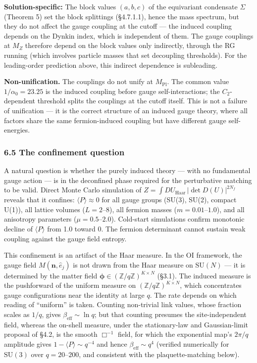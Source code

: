 \documentclass[
]{article}
\begin{document}
\textbf{Solution-specific:} The block values \((a, b, c)\) of the
equivariant condensate \(\Sigma\) (Theorem 5) set the block splittings
(§4.7.1.1), hence the mass spectrum, but they do not affect the gauge
coupling at the cutoff --- the induced coupling depends on the Dynkin
index, which is independent of them. The gauge couplings at \(M_Z\)
therefore depend on the block values only indirectly, through the RG
running (which involves particle masses that set decoupling thresholds).
For the leading-order prediction above, this indirect dependence is
subleading.

\textbf{Non-unification.} The couplings do not unify at
\(M_{\text{Pl}}\). The common value \(1/\alpha_0 = 23.25\) is the
induced coupling before gauge self-interactions; the \(C_2\)-dependent
threshold splits the couplings at the cutoff itself. This is not a
failure of unification --- it is the correct structure of an induced
gauge theory, where all factors share the same fermion-induced coupling
but have different gauge self-energies.

\hypertarget{the-confinement-question}{%
\subsubsection{6.5 The confinement
question}\label{the-confinement-question}}

A natural question is whether the purely induced theory --- with no
fundamental gauge action --- is in the deconfined phase required for the
perturbative matching to be valid. Direct Monte Carlo simulation of
\(Z = \int DU_{\text{Haar}} \, |\det D(U)|^{2N_f}\) reveals that it
confines: \(\langle P \rangle \approx 0\) for all gauge groups (SU(3),
SU(2), compact U(1)), all lattice volumes (\(L = 2\)--\(8\)), all
fermion masses (\(m = 0.01\)--\(1.0\)), and all anisotropy parameters
(\(\mu = 0.5\)--\(2.0\)). Cold-start simulations confirm monotonic
decline of \(\langle P \rangle\) from 1.0 toward 0. The fermion
determinant cannot sustain weak coupling against the gauge field
entropy.

This confinement is an artifact of the Haar measure. In the OI
framework, the gauge field \(M(\mathbf{n}, \hat{e}_j)\) is not drawn
from the Haar measure on \(\mathrm{SU}(N)\) --- it is determined by the
matter field
\(\boldsymbol{\phi} \in (\mathbb{Z}/q\mathbb{Z})^{K \times N}\) (§3.1).
The induced measure is the pushforward of the uniform measure on
\((\mathbb{Z}/q\mathbb{Z})^{K \times N}\), which concentrates gauge
configurations near the identity at large \(q\). The rate depends on
which reading of ``uniform'' is taken. Counting non-trivial link values,
whose fraction scales as \(1/q\), gives
\(\beta_{\text{eff}} \sim \ln q\); but that counting presumes the
site-independent field, whereas the on-shell measure, under the
stationary-law and Gaussian-limit proposal of §4.2, is the smooth
\(\Box^{-1}\) field, for which the exponential map's \(2\pi/q\)
amplitude gives \(1 - \langle P\rangle \sim q^{-4}\) and hence
\(\beta_{\text{eff}} \sim q^4\) (verified numerically for
\(\mathrm{SU}(3)\) over \(q = 20\)--\(200\), and consistent with the
plaquette-matching below).
\end{document}
